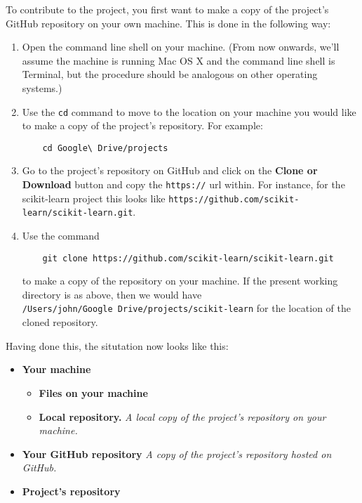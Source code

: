 \documentclass[11pt]{amsart}
\newcommand{\code}[1]{\texttt{#1}}
\begin{document}
To contribute to the project, you first want to make a copy of the project's GitHub repository on your own machine. This is done in the following way:
\begin{enumerate}
    \item Open the command line shell on your machine. (From now onwards, we'll assume the machine is running Mac OS X and the command line shell is Terminal, but the procedure should be analogous on other operating systems.)
    \item Use the \code{cd} command to move to the location on your machine you would like to make a copy of the project's repository. For example: 

    \begin{BVerbatim}
    cd Google\ Drive/projects          
    \end{BVerbatim} 

    \item Go to the project's repository on GitHub and click on the \textbf{Clone or Download} button and copy the \code{https://} url within. For instance, for the scikit-learn project this looks like \code{https://github.com/scikit-learn/scikit-learn.git}.
    \item Use the command

    \begin{BVerbatim}
    git clone https://github.com/scikit-learn/scikit-learn.git
    \end{BVerbatim} 

    to make a copy of the repository on your machine. If the present working directory is as above, then we would have \code{/Users/john/Google\ Drive/projects/scikit-learn} for the location of the cloned repository.
\end{enumerate}

Having done this, the situtation now looks like this: 
\begin{itemize}
    \item \textbf{Your machine}
    \begin{itemize}
        \item \textbf{Files on your machine}
        \item \textbf{Local repository.} \emph{A local copy of the project's repository on your machine.} 
    \end{itemize}
    \item \textbf{Your GitHub repository} \emph{A copy of the project's repository hosted on GitHub.}
    \item \textbf{Project's repository}
\end{itemize}
\end{document}
